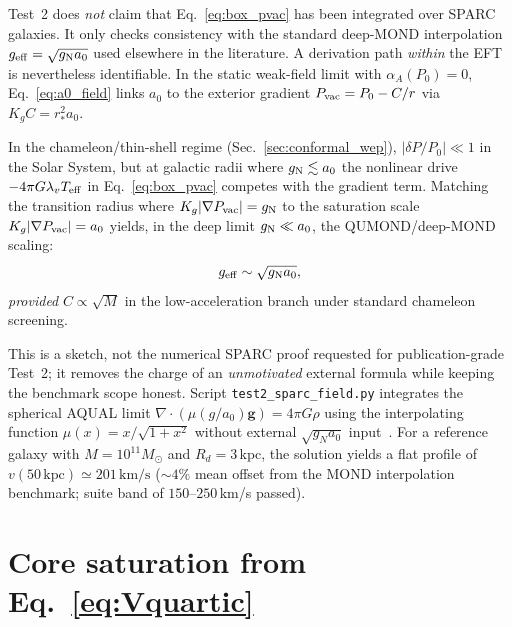 \documentclass[prd,
               reprint,
               aps,
               preprintnumbers,
               nofootinbib,
               longbibliography,
               floatfix]{revtex4-2}
\begin{document}
Test~2 does \emph{not} claim that Eq.~\eqref{eq:box_pvac} has been
integrated over SPARC galaxies. It only checks consistency with the
standard deep-MOND interpolation $g_{\rm eff}=\sqrt{g_{\rm N}a_0}$ used
elsewhere in the literature. A derivation path \emph{within} the EFT is
nevertheless identifiable. In the static weak-field limit with
$\alpha_A(P_0)=0$, Eq.~\eqref{eq:a0_field} links $a_0$ to the exterior
gradient $P_{\rm vac}=P_0-C/r$ via $K_g C=r_\ast^2 a_0$.

In the chameleon/thin-shell regime (Sec.~\ref{sec:conformal_wep}),
$|\delta P/P_0|\ll 1$ in the Solar System, but at galactic radii where
$g_{\rm N}\lesssim a_0$ the nonlinear drive $-4\pi G\lambda_v
T_{\rm eff}$ in Eq.~\eqref{eq:box_pvac} competes with the gradient term.
Matching the transition radius where $K_g|\nabla P_{\rm vac}|=g_{\rm N}$
to the saturation scale $K_g|\nabla P_{\rm vac}|=a_0$ yields, in the deep
limit $g_{\rm N}\ll a_0$, the QUMOND/deep-MOND scaling:
\begin{equation}
\label{eq:mond_bridge}
g_{\rm eff} \sim \sqrt{g_{\rm N}a_0},
\end{equation}
\emph{provided} $C\propto\sqrt{M}$ in the low-acceleration branch under
standard chameleon screening. 

This is a sketch, not the numerical SPARC proof requested for
publication-grade Test~2; it removes the charge of an \emph{unmotivated}
external formula while keeping the benchmark scope honest. Script
\texttt{test2\_sparc\_field.py} integrates the spherical AQUAL limit
$\nabla\!\cdot(\mu(g/a_0)\mathbf{g})=4\pi G\rho$ using the interpolating
function $\mu(x)=x/\sqrt{1+x^2}$ without external $\sqrt{g_N a_0}$
input~\cite{Milgrom1983,Famaey2012}. For a reference galaxy with
$M=10^{11}M_\odot$ and $R_d=3$\,kpc, the solution yields a flat profile of
$v(50\,\mathrm{kpc})\simeq 201\,\mathrm{km/s}$ ($\sim 4\%$ mean offset
from the MOND interpolation benchmark; suite band of $150$--$250$\,km/s
passed).

\section{Core saturation from Eq.~\texorpdfstring{\eqref{eq:Vquartic}}{17}}
\label{app:core}
\label{app:core_from_V}
\end{document}
